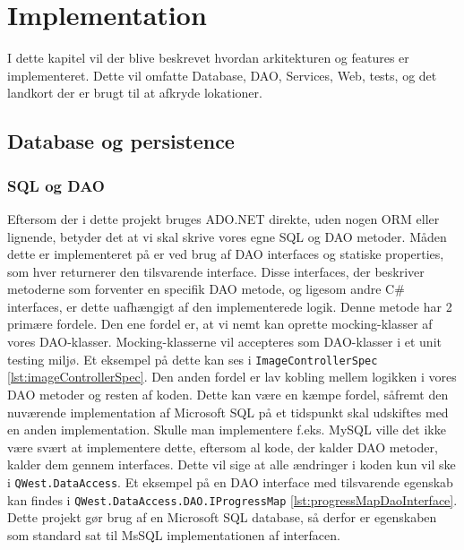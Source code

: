 \chapter{Implementation}\label{ch:implementation}
I dette kapitel vil der blive beskrevet hvordan arkitekturen og features er implementeret. Dette vil omfatte Database, DAO, Services, Web, tests, og det landkort der er brugt til at afkryde lokationer.

\section{Database og persistence}\label{sec:database}
\subsection{SQL og DAO}\label{sec:sqlOgDao}
Eftersom der i dette projekt bruges ADO.NET direkte, uden nogen ORM eller lignende, betyder det at vi skal skrive vores egne SQL og DAO metoder. Måden dette er implementeret på er ved brug af DAO interfaces og statiske properties, som hver returnerer den tilsvarende interface. Disse interfaces, der beskriver metoderne som forventer en specifik DAO metode, og ligesom andre C\# interfaces, er dette uafhængigt af den implementerede logik.
Denne metode har 2 primære fordele. Den ene fordel er, at vi nemt kan oprette mocking-klasser af vores DAO-klasser. Mocking-klasserne vil accepteres som DAO-klasser i et unit testing miljø. Et eksempel på dette kan ses i \texttt{ImageControllerSpec} \ref{lst:imageControllerSpec}.
Den anden fordel er lav kobling mellem logikken i vores DAO metoder og resten af koden. Dette kan være en kæmpe fordel, såfremt den nuværende implementation af Microsoft SQL på et tidspunkt skal udskiftes med en anden implementation. Skulle man implementere f.eks. MySQL\cite{mysql} ville det ikke være svært at implementere dette, eftersom al kode, der kalder DAO metoder, kalder dem gennem interfaces. Dette vil sige at alle ændringer i koden kun vil ske i \texttt{QWest.DataAccess}. Et eksempel på en DAO interface med tilsvarende egenskab kan findes i \texttt{QWest.DataAccess.DAO.IProgressMap} \ref{lst:progressMapDaoInterface}.
Dette projekt gør brug af en Microsoft SQL database, så derfor er egenskaben som standard sat til MsSQL implementationen af interfacen.

